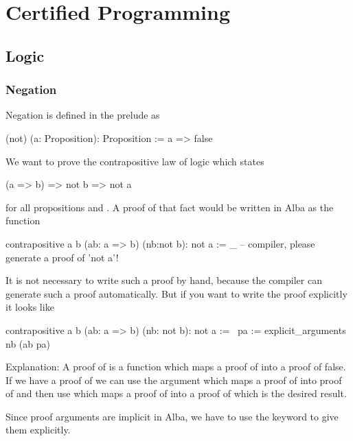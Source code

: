 
\chapter{Certified Programming}
\label{chap:certprog}





\newpage
\section{Logic}
\label{sec:certprog-logic}


\subsection{Negation}

Negation is defined in the prelude as
\begin{alba}
  (not) (a: Proposition): Proposition :=
    a => false
\end{alba}

We want to prove the contrapositive law of logic which states
\begin{alba}
  (a => b) => not b => not a
\end{alba}
for all propositions  and . A proof of that fact would be
written in Alba as the function
%
\begin{alba}
  contrapositive a b (ab: a => b) (nb:not b): not a :=
    _      -- compiler, please generate a proof of 'not a'!
\end{alba}
%
It is not necessary to write such a proof by hand, because the compiler can
generate such a proof automatically. But if you want to write the proof
explicitly it looks like

\begin{alba}
  contrapositive a b (ab: a => b) (nb: not b): not a :=
    \ pa :=
        explicit_arguments
          nb (ab pa)
\end{alba}

\noindent Explanation: A proof of  is a function which maps a
proof of  into a proof of false. If we have a proof of  we can
use the argument  which maps a proof of  into proof of
 and then use  which maps a proof of  into a proof of
 which is the desired result.

Since proof arguments are implicit in Alba, we have to use the keyword
 to give them explicitly.




